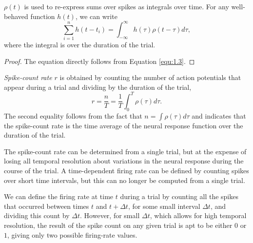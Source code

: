 \begin{thm}
  $\rho(t)$ is used to re-express sums over spikes as integrals over time. For any 
  well-behaved function $h(t)$, we can write
  \begin{equation}
    \label{equ:1.2}
    \sum_{i=1}^n h(t-t_i)=\int_{-\infty}^{\infty}h(\tau)\rho(t-\tau)d\tau,
  \end{equation}
  where the integral is over the duration of the trial.
  \begin{proof}
    The equation directly follows from Equation \ref{equ:1.3}.
  \end{proof}
\end{thm}

\begin{defn}
  \emph{Spike-count rate $r$} is obtained by counting the number of action potentials that appear during a trial and
  dividing by the duration of the trial,
  \begin{equation}
    r=\frac{n}{T}=\frac{1}{T}\int_0^T\rho(\tau)d\tau.
  \end{equation}
  The second equality follows from the fact that $n=\int\rho(\tau)d\tau$ and indicates
that the spike-count rate is the time average of the neural response function over the 
duration of the trial.
\end{defn}


\begin{rem}
  The spike-count rate can be determined from a single trial, but at the expense of 
  losing all temporal resolution about variations in the neural response during the 
  course of the trial. A time-dependent firing rate can be defined by counting spikes 
  over short time intervals, but this can no longer
be computed from a single trial.
\end{rem}

\begin{exm}
  We can define the firing rate
at time $t$ during a trial by counting all the spikes that occurred between
times $t$ and $t + \Delta t$, for some small interval $\Delta t$, and dividing this count by
$\Delta t$. However, for small $\Delta t$, which allows for high temporal resolution, the
result of the spike count on any given trial is apt to be either $0$ or $1$, giving
only two possible firing-rate values.
\end{exm}

